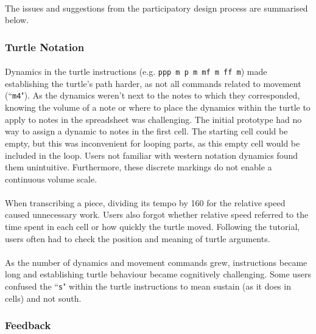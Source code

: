 \paragraph{} The issues and suggestions from the participatory design process are summarised below.

\subsubsection{Turtle Notation}

\paragraph{} Dynamics in the turtle instructions (e.g. \texttt{ppp m p m mf m ff m}) made establishing the turtle's path harder, as not all commands related to movement (``\texttt{m4}"). As the dynamics weren't next to the notes to which they corresponded, knowing the volume of a note or where to place the dynamics within the turtle to apply to notes in the spreadsheet was challenging. The initial prototype had no way to assign a dynamic to notes in the first cell. The starting cell could be empty, but this was inconvenient for looping parts, as this empty cell would be included in the loop. Users not familiar with western notation dynamics found them unintuitive. Furthermore, these discrete markings do not enable a continuous volume scale.

\paragraph{} When transcribing a piece, dividing its tempo by 160 for the relative speed caused unnecessary work. Users also forgot whether relative speed referred to the time spent in each cell or how quickly the turtle moved. Following the tutorial, users often had to check the position and meaning of turtle arguments.

\paragraph{} As the number of dynamics and movement commands grew, instructions became long and establishing turtle behaviour became cognitively challenging. Some users confused the ``\texttt{s}" within the turtle instructions to mean sustain (as it does in cells) and not south.

\subsubsection{Feedback}

